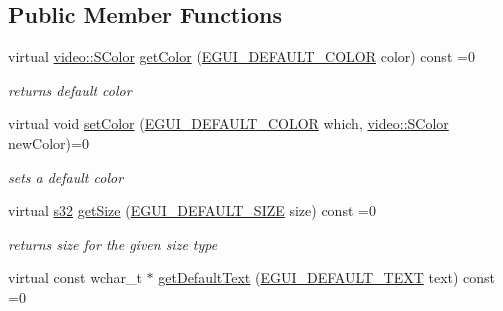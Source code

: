 \subsection*{Public Member Functions}
\begin{DoxyCompactItemize}
\item 
\mbox{\label{classirr_1_1gui_1_1IGUISkin_ad1afa2e5e34c30e0cbfb85b1dee2dbe3}} 
virtual \hyperlink{classirr_1_1video_1_1SColor}{video\+::\+S\+Color} \hyperlink{classirr_1_1gui_1_1IGUISkin_ad1afa2e5e34c30e0cbfb85b1dee2dbe3}{get\+Color} (\hyperlink{namespaceirr_1_1gui_abd15860fde29833c48daff5f95d5467a}{E\+G\+U\+I\+\_\+\+D\+E\+F\+A\+U\+L\+T\+\_\+\+C\+O\+L\+OR} color) const =0
\begin{DoxyCompactList}\small\item\em returns default color \end{DoxyCompactList}\item 
\mbox{\label{classirr_1_1gui_1_1IGUISkin_ab9782296ba881872207a0915a81d7807}} 
virtual void \hyperlink{classirr_1_1gui_1_1IGUISkin_ab9782296ba881872207a0915a81d7807}{set\+Color} (\hyperlink{namespaceirr_1_1gui_abd15860fde29833c48daff5f95d5467a}{E\+G\+U\+I\+\_\+\+D\+E\+F\+A\+U\+L\+T\+\_\+\+C\+O\+L\+OR} which, \hyperlink{classirr_1_1video_1_1SColor}{video\+::\+S\+Color} new\+Color)=0
\begin{DoxyCompactList}\small\item\em sets a default color \end{DoxyCompactList}\item 
\mbox{\label{classirr_1_1gui_1_1IGUISkin_ac48a8a0b6cdccacfa90a0fb23e4d9503}} 
virtual \hyperlink{namespaceirr_ac66849b7a6ed16e30ebede579f9b47c6}{s32} \hyperlink{classirr_1_1gui_1_1IGUISkin_ac48a8a0b6cdccacfa90a0fb23e4d9503}{get\+Size} (\hyperlink{namespaceirr_1_1gui_a27be6aa12d4985a5005983182fe99d56}{E\+G\+U\+I\+\_\+\+D\+E\+F\+A\+U\+L\+T\+\_\+\+S\+I\+ZE} size) const =0
\begin{DoxyCompactList}\small\item\em returns size for the given size type \end{DoxyCompactList}\item 
virtual const wchar\+\_\+t $\ast$ \hyperlink{classirr_1_1gui_1_1IGUISkin_a48a987d458a0e6f4e71fe6fd9cfecb2d}{get\+Default\+Text} (\hyperlink{namespaceirr_1_1gui_a18bc64c635f8b0db66498d779569e296}{E\+G\+U\+I\+\_\+\+D\+E\+F\+A\+U\+L\+T\+\_\+\+T\+E\+XT} text) const =0

\end{DoxyCompactItemize}
